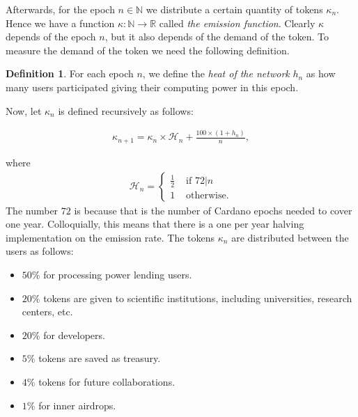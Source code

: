 \documentclass[11pt]{amsart}
\numberwithin{equation}{section}
\theoremstyle{definition}
\newtheorem{definition}[theorem]{Definition}
\theoremstyle{remark}
\newcommand{\N}{\mathbb N}
\renewcommand{\_}[1]{_{\left( #1 \right)}}
\renewcommand{\^}[1]{^{\left( #1 \right)}}
\begin{document}
Afterwards, for the epoch $n\in\N$ we distribute a certain quantity of tokens $\kappa_n$. Hence we have a function $\kappa\colon \N \longrightarrow \mathbb{R}$ called \emph{the emission function}. Clearly $\kappa$ depends of the epoch $n$, but it also depends of the demand of the token. To measure the demand of the token we need the following definition.


\begin{definition}
	For each epoch $n$, we define the \emph{heat of the network} $h_n$ as how many users participated giving their computing power in this epoch.
\end{definition}

Now, let $\kappa_n$ is defined recursively as follows:

\begin{align*}
\kappa_{n+1} = \kappa_n \times \mathcal{H}_n+ \frac{100\times (1+ h_n)}{n},
\end{align*}

where 
\begin{align*}
\mathcal{H}_n = \begin{cases*}
 \frac{1}{2}& \text{ if } 72| n\\
1 & \text{ otherwise}.
\end{cases*}
\end{align*}
The number $72$ is because that is the number of Cardano epochs needed to cover one year. Colloquially, this means that there is a one per year halving implementation on the emission rate. The tokens $\kappa_n$ are distributed between the users as follows:
\begin{itemize}
	\item $50\%$ for processing power lending users.
	\item $20\%$ tokens are given to scientific institutions, including universities, research centers, etc.
	\item $20\%$ for developers.
	\item $5\%$ tokens are saved as treasury.
	\item $4\%$ tokens for future collaborations.
	\item $1\%$ for inner airdrops.
\end{itemize}
\end{document}

